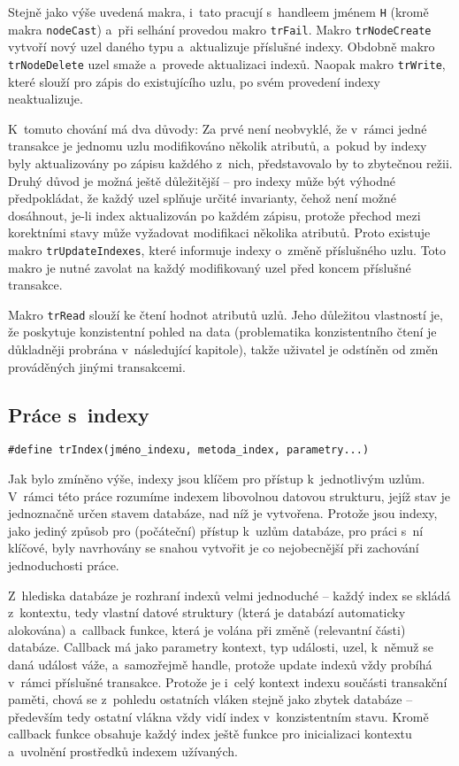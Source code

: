 Stejně jako výše uvedená makra, i~tato pracují s~handleem jménem \verb|H| (kromě makra
\verb|nodeCast|) a~při selhání provedou makro \verb|trFail|. Makro \verb|trNodeCreate|
vytvoří nový uzel daného typu a~aktualizuje příslušné indexy. Obdobně makro 
\verb|trNodeDelete|
uzel smaže a~provede aktualizaci indexů. Naopak makro \verb|trWrite|, které slouží pro
zápis do existujícího uzlu, po svém provedení indexy neaktualizuje.

K~tomuto chování
má dva důvody: Za prvé není neobvyklé, že v~rámci jedné transakce je jednomu uzlu
modifikováno několik atributů, a~pokud by indexy byly aktualizovány po zápisu každého
z~nich, představovalo by to zbytečnou režii. Druhý důvod je možná ještě důležitější
-- pro indexy může být výhodné předpokládat, že každý uzel splňuje určité invarianty,
čehož není možné dosáhnout, je-li index aktualizován po každém zápisu, protože přechod
mezi korektními stavy může vyžadovat modifikaci několika atributů. Proto existuje
makro \verb|trUpdateIndexes|, které informuje indexy o~změně příslušného uzlu.
Toto makro je nutné zavolat na každý modifikovaný uzel před koncem příslušné transakce.

Makro \verb|trRead| slouží ke čtení hodnot atributů uzlů. Jeho důležitou vlastností
je, že poskytuje konzistentní pohled na data (problematika konzistentního čtení
je důkladněji probrána v~následující kapitole), takže uživatel je odstíněn od změn
prováděných jinými transakcemi. 

\subsection{Práce s~indexy}

\begin{verbatim}
#define trIndex(jméno_indexu, metoda_index, parametry...)
\end{verbatim}
Jak bylo zmíněno výše, indexy jsou klíčem pro přístup k~jednotlivým uzlům.
V~rámci této práce rozumíme indexem libovolnou datovou strukturu, jejíž
stav je jednoznačně určen stavem databáze, nad níž je vytvořena. Protože jsou indexy,
jako jediný způsob pro (počáteční) přístup k~uzlům databáze, pro práci s~ní
klíčové, byly navrhovány se snahou vytvořit je co nejobecnější při zachování
jednoduchosti práce.

Z~hlediska databáze
je rozhraní indexů velmi jednoduché -- každý index se skládá z~kontextu, tedy vlastní
datové struktury (která je databází automaticky alokována) a~callback funkce, která
je volána při změně (relevantní části) databáze. Callback má jako parametry kontext,
typ události, uzel, k~němuž se daná událost váže, a~samozřejmě handle, protože update
indexů vždy probíhá v~rámci příslušné transakce. Protože je i~celý kontext indexu
součásti transakční paměti, chová se z~pohledu ostatních vláken stejně jako zbytek
databáze -- především tedy ostatní vlákna vždy vidí index v~konzistentním stavu.
Kromě callback funkce obsahuje každý index ještě funkce pro inicializaci kontextu
a~uvolnění prostředků indexem užívaných.

